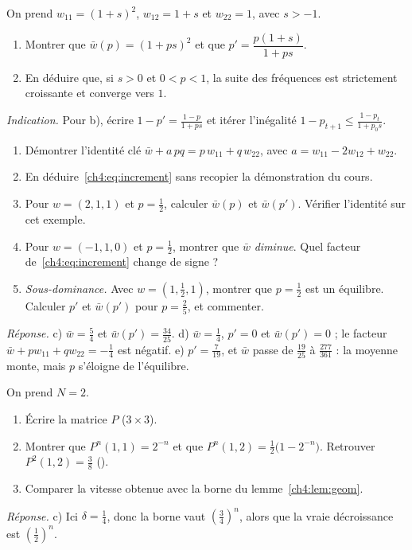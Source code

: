 \begin{exercise}
On prend $w_{11}=(1+s)^2$, $w_{12}=1+s$ et $w_{22}=1$, avec $s>-1$.
\begin{enumerate}[label=\alph*),itemsep=0pt]
\item Montrer que $\bar w(p)=(1+ps)^2$ et que $p'=\dfrac{p(1+s)}{1+ps}$.
\item En déduire que, si $s>0$ et $0<p<1$, la suite des fréquences est strictement croissante et converge vers
$1$.
\end{enumerate}
\emph{Indication.} Pour b), écrire $1-p'=\frac{1-p}{1+ps}$ et itérer l'inégalité $1-p_{t+1}\le\frac{1-p_t}{1+p_0s}$.
\end{exercise}

\begin{exercise}\label{ch4:ex:increment}
\begin{enumerate}[label=\alph*),itemsep=0pt]
\item Démontrer l'identité clé $\bar w+a\,pq=p\,w_{11}+q\,w_{22}$, avec $a=w_{11}-2w_{12}+w_{22}$.
\item En déduire~\eqref{ch4:eq:increment} sans recopier la démonstration du cours.
\item Pour $w=(2,1,1)$ et $p=\frac12$, calculer $\bar w(p)$ et $\bar w(p')$. Vérifier l'identité sur cet exemple.
\item Pour $w=(-1,1,0)$ et $p=\frac12$, montrer que $\bar w$ \emph{diminue}. Quel facteur
de~\eqref{ch4:eq:increment} change de signe ?
\item \emph{Sous-dominance.} Avec $w=(1,\frac12,1)$, montrer que $p=\frac12$ est un équilibre. Calculer $p'$ et
$\bar w(p')$ pour $p=\frac25$, et commenter.
\end{enumerate}
\emph{Réponse.} c) $\bar w=\frac54$ et $\bar w(p')=\frac{34}{25}$. d) $\bar w=\frac14$, $p'=0$ et $\bar w(p')=0$ ;
le facteur $\bar w+pw_{11}+qw_{22}=-\frac14$ est négatif. e) $p'=\frac7{19}$, et $\bar w$ passe de $\frac{19}{25}$
à $\frac{277}{361}$ : la moyenne monte, mais $p$ s'éloigne de l'équilibre.
\end{exercise}

\begin{exercise}\label{ch4:ex:wf2}
On prend $N=2$.
\begin{enumerate}[label=\alph*),itemsep=0pt]
\item Écrire la matrice $P$ ($3\times3$).
\item Montrer que $P^n(1,1)=2^{-n}$ et que $P^n(1,2)=\frac12\bigl(1-2^{-n}\bigr)$. Retrouver $P^2(1,2)=\frac38$
().
\item Comparer la vitesse obtenue avec la borne du lemme~\ref{ch4:lem:geom}.
\end{enumerate}
\emph{Réponse.} c) Ici $\delta=\frac14$, donc la borne vaut $(\frac34)^n$, alors que la vraie décroissance est
$(\frac12)^n$.
\end{exercise}

